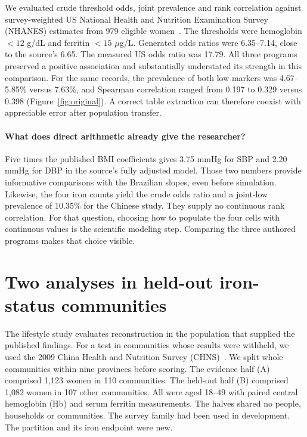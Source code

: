 \documentclass[sigconf,anonymous,review]{acmart}
\begin{document}
We evaluated crude threshold odds, joint prevalence and rank correlation against survey-weighted US National Health and Nutrition Examination Survey (NHANES) estimates from 979 eligible women~\cite{nhanes}. The thresholds were hemoglobin $<12$ g/dL and ferritin $<15$ $\mu$g/L. Generated odds ratios were 6.35--7.14, close to the source's 6.65. The measured US odds ratio was 17.79. All three programs preserved a positive association and substantially understated its strength in this comparison. For the same records, the prevalence of both low markers was 4.67--5.85\% versus 7.63\%, and Spearman correlation ranged from 0.197 to 0.329 versus 0.398 (Figure~\ref{fig:original}). A correct table extraction can therefore coexist with appreciable error after population transfer.

\paragraph{What does direct arithmetic already give the researcher?}
Five times the published BMI coefficients gives 3.75 mmHg for SBP and 2.20 mmHg for DBP in the source's fully adjusted model. Those two numbers provide informative comparisons with the Brazilian slopes, even before simulation. Likewise, the four iron counts yield the crude odds ratio and a joint-low prevalence of 10.35\% for the Chinese study. They supply no continuous rank correlation. For that question, choosing how to populate the four cells with continuous values is the scientific modeling step. Comparing the three authored programs makes that choice visible.

\section{Two analyses in held-out iron-status communities}
\label{sec:chns}
The lifestyle study evaluates reconstruction in the population that supplied the published findings. For a test in communities whose results were withheld, we used the 2009 China Health and Nutrition Survey (CHNS)~\cite{chnsbio,chnsind}. We split whole communities within nine provinces before scoring. The evidence half (A) comprised 1,123 women in 110 communities. The held-out half (B) comprised 1,082 women in 107 other communities. All were aged 18--49 with paired central hemoglobin (Hb) and serum ferritin measurements. The halves shared no people, households or communities. The survey family had been used in development. The partition and its iron endpoint were new.
\end{document}
